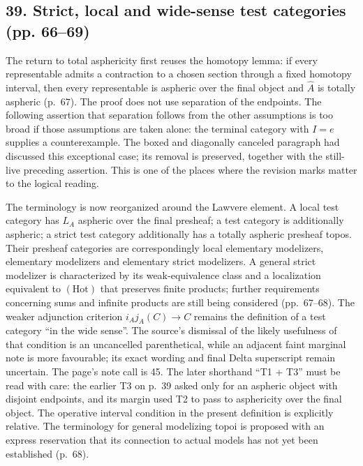 \subsection*{39. Strict, local and wide-sense test categories (pp. 66--69)}
The return to total asphericity first reuses the homotopy lemma: if every representable admits a contraction to a chosen section through a fixed homotopy interval, then every representable is aspheric over the final object and $\widehat A$ is totally aspheric (p.~67). The proof does not use separation of the endpoints. The following assertion that separation follows from the other assumptions is too broad if those assumptions are taken alone: the terminal category with $I=e$ supplies a counterexample. The boxed and diagonally canceled paragraph had discussed this exceptional case; its removal is preserved, together with the still-live preceding assertion. This is one of the places where the revision marks matter to the logical reading.

The terminology is now reorganized around the Lawvere element. A local test category has $L_A$ aspheric over the final presheaf; a test category is additionally aspheric; a strict test category additionally has a totally aspheric presheaf topos. Their presheaf categories are correspondingly local elementary modelizers, elementary modelizers and elementary strict modelizers. A general strict modelizer is characterized by its weak-equivalence class and a localization equivalent to $(\mathrm{Hot})$ that preserves finite products; further requirements concerning sums and infinite products are still being considered (pp.~67--68). The weaker adjunction criterion $i_Aj_A(C)\to C$ remains the definition of a test category ``in the wide sense''. The source's dismissal of the likely usefulness of that condition is an uncancelled parenthetical, while an adjacent faint marginal note is more favourable; its exact wording and final Delta superscript remain uncertain. The page's note call is 45. The later shorthand ``T1 + T3'' must be read with care: the earlier T3 on p.~39 asked only for an aspheric object with disjoint endpoints, and its margin used T2 to pass to asphericity over the final object. The operative interval condition in the present definition is explicitly relative. The terminology for general modelizing topoi is proposed with an express reservation that its connection to actual models has not yet been established (p.~68).


